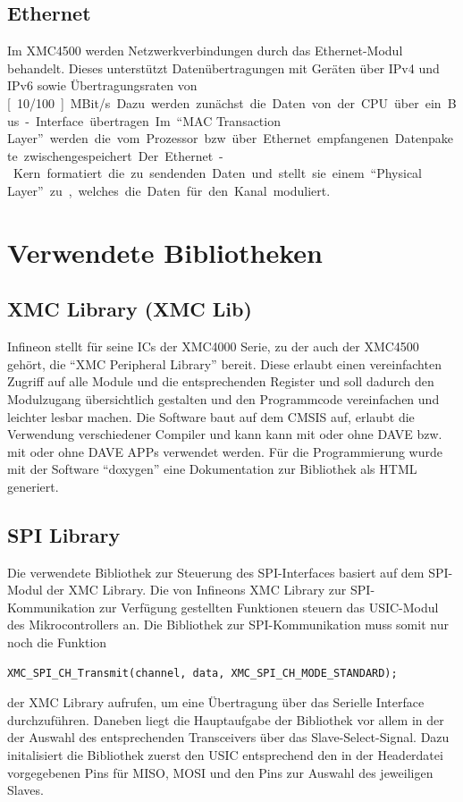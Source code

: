 \subsection{Ethernet} 
Im XMC4500 werden Netzwerkverbindungen durch das  Ethernet-Modul behandelt. Dieses unterstützt Datenübertragungen mit Geräten über IPv4 und IPv6 sowie Übertragungsraten von \unit[10/100]{MBit/s}.  Dazu werden zunächst die Daten von der CPU über ein Bus-Interface übertragen. Im \enquote{MAC Transaction Layer} werden die vom Prozessor bzw. über Ethernet empfangenen Datenpakete zwischengespeichert. Der Ethernet-Kern formatiert die zu sendenden Daten und stellt sie einem \enquote{Physical Layer} zu, welches die Daten für den Kanal moduliert.






\section{Verwendete Bibliotheken}
\subsection{XMC Library (XMC Lib)}
Infineon stellt für seine \acp{IC} der XMC4000 Serie, zu der auch der XMC4500 gehört, die \enquote{XMC Peripheral Library} bereit. Diese erlaubt einen vereinfachten Zugriff auf alle Module und die entsprechenden Register und soll dadurch den Modulzugang übersichtlich gestalten und den Programmcode vereinfachen und leichter lesbar machen. Die Software baut auf dem \ac{CMSIS} auf, erlaubt die Verwendung verschiedener Compiler und kann kann mit oder ohne DAVE bzw. mit oder ohne DAVE APPs verwendet werden. %
Für die Programmierung wurde mit der Software \enquote{doxygen} eine Dokumentation zur Bibliothek als HTML generiert.

\subsection{SPI Library}
Die verwendete Bibliothek zur Steuerung des \ac{SPI}-Interfaces basiert auf dem \ac{SPI}-Modul der XMC Library. Die von Infineons XMC Library zur \ac{SPI}-Kommunikation zur Verfügung gestellten Funktionen steuern das \ac{USIC}-Modul des Mikrocontrollers an. Die Bibliothek zur \ac{SPI}-Kommunikation muss somit nur noch die Funktion
\begin{lstlisting}
XMC_SPI_CH_Transmit(channel, data, XMC_SPI_CH_MODE_STANDARD);
\end{lstlisting} der XMC Library aufrufen, um eine Übertragung über das Serielle Interface durchzuführen. Daneben liegt die Hauptaufgabe der Bibliothek vor allem in der der Auswahl des entsprechenden Transceivers über das Slave-Select-Signal. Dazu initalisiert die Bibliothek zuerst den \ac{USIC} entsprechend den in der Headerdatei vorgegebenen Pins für MISO, MOSI und den Pins zur Auswahl des jeweiligen Slaves.

